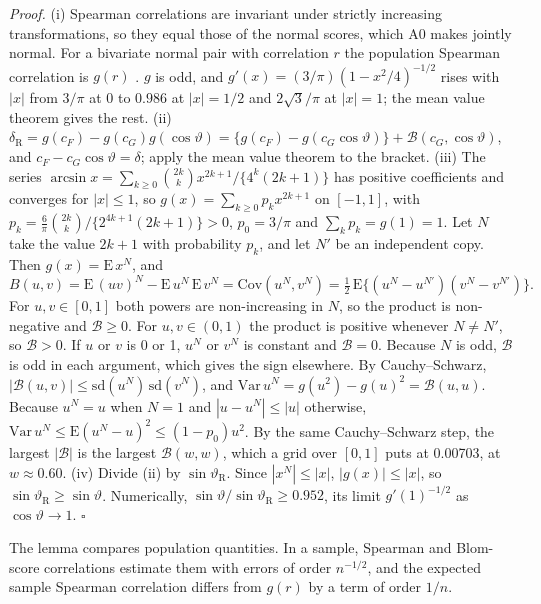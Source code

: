 \documentclass[11pt]{article}
\newcommand{\qedsq}{\hfill$\square$}
\begin{document}
\emph{Proof.} (i) Spearman correlations are invariant under strictly increasing transformations, so they equal those
of the normal scores, which A0 makes jointly normal. For a bivariate normal pair with correlation $r$ the population
Spearman correlation is $g(r)$ \citep{kruskal1958ordinal}. $g$ is odd, and $g'(x)=(3/\pi)(1-x^2/4)^{-1/2}$ rises with
$|x|$ from $3/\pi$ at 0 to $0.986$ at $|x|=1/2$ and $2\sqrt3/\pi$ at $|x|=1$; the mean value theorem gives the rest.
(ii) $\delta_{\mathrm R}=g(c_F)-g(c_G)g(\cos\vartheta)=\{g(c_F)-g(c_G\cos\vartheta)\}+\mathcal B(c_G,\cos\vartheta)$, and
$c_F-c_G\cos\vartheta=\delta$; apply the mean value theorem to the bracket.
(iii) The series $\arcsin x=\sum_{k\ge0}\binom{2k}{k}x^{2k+1}/\{4^k(2k+1)\}$ has positive coefficients and converges
for $|x|\le1$, so $g(x)=\sum_{k\ge0}p_kx^{2k+1}$ on $[-1,1]$, with $p_k=\tfrac6\pi\binom{2k}{k}/\{2^{4k+1}(2k+1)\}>0$,
$p_0=3/\pi$ and $\sum_kp_k=g(1)=1$. Let $N$ take the value $2k+1$ with probability $p_k$, and let $N'$ be an
independent copy. Then $g(x)=\mathrm E\,x^N$, and
\[
B(u,v)=\mathrm E\,(uv)^N-\mathrm E\,u^N\,\mathrm E\,v^N=\mathrm{Cov}(u^N,v^N)=
\tfrac12\,\mathrm E\{(u^N-u^{N'})(v^N-v^{N'})\}.
\]
For $u,v\in[0,1]$ both powers are non-increasing in $N$, so the product is non-negative and $\mathcal B\ge0$. For
$u,v\in(0,1)$ the product is positive whenever $N\neq N'$, so $\mathcal B>0$. If $u$ or $v$ is 0 or 1, $u^N$ or $v^N$ is
constant and $\mathcal B=0$. Because $N$ is odd, $\mathcal B$ is odd in each argument, which gives the sign elsewhere. By
Cauchy--Schwarz, $|\mathcal B(u,v)|\le\mathrm{sd}(u^N)\,\mathrm{sd}(v^N)$, and $\mathrm{Var}\,u^N=g(u^2)-g(u)^2=\mathcal B(u,u)$. Because
$u^N=u$ when $N=1$ and $|u-u^N|\le|u|$ otherwise, $\mathrm{Var}\,u^N\le\mathrm E(u^N-u)^2\le(1-p_0)u^2$. By the same
Cauchy--Schwarz step, the largest $|\mathcal B|$ is the largest $\mathcal B(w,w)$, which a grid over $[0,1]$ puts at 0.00703, at $w\approx0.60$.
(iv) Divide (ii) by $\sin\vartheta_{\mathrm R}$. Since $|x^N|\le|x|$, $|g(x)|\le|x|$, so
$\sin\vartheta_{\mathrm R}\ge\sin\vartheta$. Numerically, $\sin\vartheta/\sin\vartheta_{\mathrm R}\ge0.952$, its limit
$g'(1)^{-1/2}$ as $\cos\vartheta\to1$. \qedsq

The lemma compares population quantities. In a sample, Spearman and Blom-score correlations estimate them with errors
of order $n^{-1/2}$, and the expected sample Spearman correlation differs from $g(r)$ by a term of order $1/n$.
\end{document}
